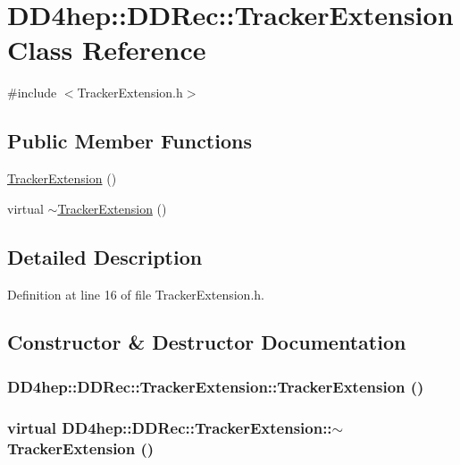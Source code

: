\hypertarget{class_d_d4hep_1_1_d_d_rec_1_1_tracker_extension}{
\section{DD4hep::DDRec::TrackerExtension Class Reference}
\label{class_d_d4hep_1_1_d_d_rec_1_1_tracker_extension}
}


{\ttfamily \#include $<$TrackerExtension.h$>$}\subsection*{Public Member Functions}
\begin{DoxyCompactItemize}
\item 
\hyperlink{class_d_d4hep_1_1_d_d_rec_1_1_tracker_extension_a8b8d1e0e426ac0a878610c1c8e5f5640}{TrackerExtension} ()
\item 
virtual \hyperlink{class_d_d4hep_1_1_d_d_rec_1_1_tracker_extension_a0220264e3c52c6b3f17b29bc817894ee}{$\sim$TrackerExtension} ()
\end{DoxyCompactItemize}


\subsection{Detailed Description}


Definition at line 16 of file TrackerExtension.h.

\subsection{Constructor \& Destructor Documentation}
\hypertarget{class_d_d4hep_1_1_d_d_rec_1_1_tracker_extension_a8b8d1e0e426ac0a878610c1c8e5f5640}{
\subsubsection[{TrackerExtension}]{\setlength{\rightskip}{0pt plus 5cm}DD4hep::DDRec::TrackerExtension::TrackerExtension ()}}
\label{class_d_d4hep_1_1_d_d_rec_1_1_tracker_extension_a8b8d1e0e426ac0a878610c1c8e5f5640}
\hypertarget{class_d_d4hep_1_1_d_d_rec_1_1_tracker_extension_a0220264e3c52c6b3f17b29bc817894ee}{
\subsubsection[{$\sim$TrackerExtension}]{\setlength{\rightskip}{0pt plus 5cm}virtual DD4hep::DDRec::TrackerExtension::$\sim$TrackerExtension ()}}
\label{class_d_d4hep_1_1_d_d_rec_1_1_tracker_extension_a0220264e3c52c6b3f17b29bc817894ee}


